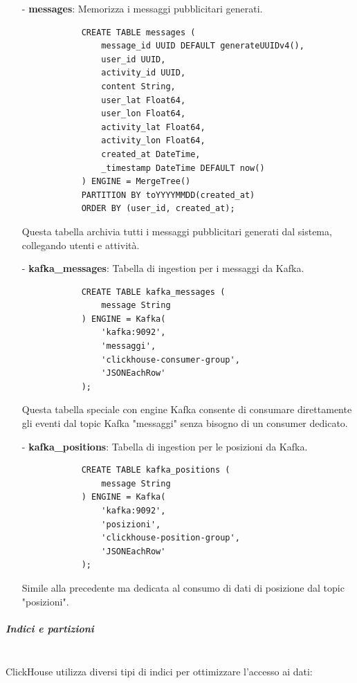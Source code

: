 \documentclass[10pt]{article}
\newcommand{\mysubparagraph}[1]{\subparagraph{#1}\mbox{}\\}
\begin{document}
\begin{itemize}
            \item[-] \textbf{messages}: Memorizza i messaggi pubblicitari generati.
            \begin{lstlisting}
            CREATE TABLE messages (
                message_id UUID DEFAULT generateUUIDv4(),
                user_id UUID,
                activity_id UUID,
                content String,
                user_lat Float64,
                user_lon Float64,
                activity_lat Float64,
                activity_lon Float64,
                created_at DateTime,
                _timestamp DateTime DEFAULT now()
            ) ENGINE = MergeTree()
            PARTITION BY toYYYYMMDD(created_at)
            ORDER BY (user_id, created_at);
            \end{lstlisting}
            Questa tabella archivia tutti i messaggi pubblicitari generati dal sistema, collegando utenti e attività.

            \item[-] \textbf{kafka\_messages}: Tabella di ingestion per i messaggi da Kafka.
            \begin{lstlisting}
            CREATE TABLE kafka_messages (
                message String
            ) ENGINE = Kafka(
                'kafka:9092',
                'messaggi',
                'clickhouse-consumer-group',
                'JSONEachRow'
            );
            \end{lstlisting}
            Questa tabella speciale con engine Kafka consente di consumare direttamente gli eventi dal topic Kafka "messaggi" senza bisogno di un consumer dedicato.

            \item[-] \textbf{kafka\_positions}: Tabella di ingestion per le posizioni da Kafka.
            \begin{lstlisting}
            CREATE TABLE kafka_positions (
                message String
            ) ENGINE = Kafka(
                'kafka:9092',
                'posizioni',
                'clickhouse-position-group',
                'JSONEachRow'
            );
            \end{lstlisting}
            Simile alla precedente ma dedicata al consumo di dati di posizione dal topic "posizioni".
        \end{itemize}

        \mysubparagraph{Indici e partizioni}
        ClickHouse utilizza diversi tipi di indici per ottimizzare l'accesso ai dati:
\end{document}
